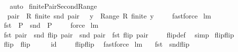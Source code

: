 \begin{isabellebody}
%
\isadelimproof
\ \ %
\endisadelimproof
%
\isatagproof
{}\isamarkupfalse%
\ auto%
\endisatagproof
{\isafoldproof}%
%
\isadelimproof
\isanewline
%
\endisadelimproof
\isanewline
{}\isamarkupfalse%
\ finitePairSecondRange{\isacharcolon}\ \isanewline
\ \ {\isachardoublequoteopen}{\isacharparenleft}{\isasymforall}\ pair\ {\isasymin}\ R{\isachardot}\ finite\ {\isacharparenleft}snd\ pair{\isacharparenright}{\isacharparenright}\ {\isacharequal}\ {\isacharparenleft}{\isasymforall}\ y\ {\isasymin}\ Range\ R{\isachardot}\ finite\ y{\isacharparenright}{\isachardoublequoteclose}\ \isanewline
%
\isadelimproof
\ \ %
\endisadelimproof
%
\isatagproof
{}\isamarkupfalse%
\ fastforce%
\endisatagproof
{\isafoldproof}%
%
\isadelimproof
\isanewline
%
\endisadelimproof
\isanewline
{}\isamarkupfalse%
\ lm{}{}{}{\isacharcolon}\ \isanewline
\ \ {\isachardoublequoteopen}fst\ {\isacharbackquote}\ P\ {\isacharequal}\ snd\ {\isacharbackquote}\ {\isacharparenleft}P{\isacharcircum}{\isacharminus}{}{\isacharparenright}{\isachardoublequoteclose}\ \isanewline
%
\isadelimproof
\ \ %
\endisadelimproof
%
\isatagproof
{}\isamarkupfalse%
\ force%
\endisatagproof
{\isafoldproof}%
%
\isadelimproof
\isanewline
%
\endisadelimproof
\isanewline
{}\isamarkupfalse%
\ lm{}{}{}{\isacharcolon}\ \isanewline
\ \ {\isachardoublequoteopen}fst\ pair\ {\isacharequal}\ snd\ {\isacharparenleft}flip\ pair{\isacharparenright}\ {\isacharampersand}\ snd\ pair\ {\isacharequal}\ fst\ {\isacharparenleft}flip\ pair{\isacharparenright}{\isachardoublequoteclose}\ \isanewline
%
\isadelimproof
\ \ %
\endisadelimproof
%
\isatagproof
{}\isamarkupfalse%
\ flip{\isacharunderscore}def\ \isamarkupfalse%
\ simp%
\endisatagproof
{\isafoldproof}%
%
\isadelimproof
\isanewline
%
\endisadelimproof
\isanewline
{}\isamarkupfalse%
\ flip{\isacharunderscore}flip{}{\isacharcolon}\ \isanewline
\ \ {\isachardoublequoteopen}flip\ {\isasymcirc}\ flip\ \ \ {\isacharequal}\ \ \ id{\isachardoublequoteclose}\ \isanewline
%
\isadelimproof
\ \ %
\endisadelimproof
%
\isatagproof
{}\isamarkupfalse%
\ flip{\isacharunderscore}flip\ \isamarkupfalse%
\ fastforce%
\endisatagproof
{\isafoldproof}%
%
\isadelimproof
\isanewline
%
\endisadelimproof
\isanewline
{}\isamarkupfalse%
\ lm{}{}{}{\isacharcolon}\ \isanewline
\ \ {\isachardoublequoteopen}fst\ {\isacharequal}\ {\isacharparenleft}snd{\isasymcirc}flip{\isacharparenright}{\isachardoublequoteclose}\ \isanewline

\end{isabellebody}
